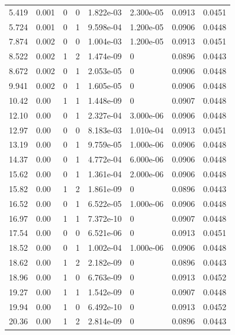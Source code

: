 \documentclass[preview]{standalone}
\begin{document}
{{\begin{tabular}{L{1.2cm}C{1.2cm} C{0.3cm}C{0.5cm} C{1.4cm}C{1.4cm} C{1.4cm}C{1.4cm}}
  5.419  &  0.001  & 0     &  0 &  1.822e-03  & 2.300e-05  & 0.0913 &  0.0451   \\ 
  5.724  &  0.001  & 0     &  1 &  9.598e-04  & 1.200e-05  & 0.0906 &  0.0448   \\ 
  7.874  &  0.002  & 0     &  0 &  1.004e-03  & 1.200e-05  & 0.0913 &  0.0451   \\ 
  8.522  &  0.002  & 1     &  2 &  1.474e-09  & 0  & 0.0896 &  0.0443   \\ 
  8.672  &  0.002  & 0     &  1 &  2.053e-05  & 0  & 0.0906 &  0.0448   \\ 
  9.941  &  0.002  & 0     &  1 &  1.605e-05  & 0  & 0.0906 &  0.0448   \\ 
  10.42  &  0.00  & 1     &  1 &  1.448e-09  & 0  & 0.0907 &  0.0448   \\ 
  12.10  &  0.00  & 0     &  1 &  2.327e-04  & 3.000e-06  & 0.0906 &  0.0448   \\ 
  12.97  &  0.00  & 0     &  0 &  8.183e-03  & 1.010e-04  & 0.0913 &  0.0451   \\ 
  13.19  &  0.00  & 0     &  1 &  9.759e-05  & 1.000e-06  & 0.0906 &  0.0448   \\ 
  14.37  &  0.00  & 0     &  1 &  4.772e-04  & 6.000e-06  & 0.0906 &  0.0448   \\ 
  15.62  &  0.00  & 0     &  1 &  1.361e-04  & 2.000e-06  & 0.0906 &  0.0448   \\ 
  15.82  &  0.00  & 1     &  2 &  1.861e-09  & 0  & 0.0896 &  0.0443   \\ 
  16.52  &  0.00  & 0     &  1 &  6.522e-05  & 1.000e-06  & 0.0906 &  0.0448   \\ 
  16.97  &  0.00  & 1     &  1 &  7.372e-10  & 0  & 0.0907 &  0.0448   \\ 
  17.54  &  0.00  & 0     &  0 &  6.521e-06  & 0  & 0.0913 &  0.0451   \\ 
  18.52  &  0.00  & 0     &  1 &  1.002e-04  & 1.000e-06  & 0.0906 &  0.0448   \\ 
  18.62  &  0.00  & 1     &  2 &  2.182e-09  & 0  & 0.0896 &  0.0443   \\ 
  18.96  &  0.00  & 1     &  0 &  6.763e-09  & 0  & 0.0913 &  0.0452   \\ 
  19.27  &  0.00  & 1     &  1 &  1.542e-09  & 0  & 0.0907 &  0.0448   \\ 
  19.94  &  0.00  & 1     &  0 &  6.492e-10  & 0  & 0.0913 &  0.0452   \\ 
  20.36  &  0.00  & 1     &  2 &  2.814e-09  & 0  & 0.0896 &  0.0443   \\ 

\end{tabular}}}
\end{document}
